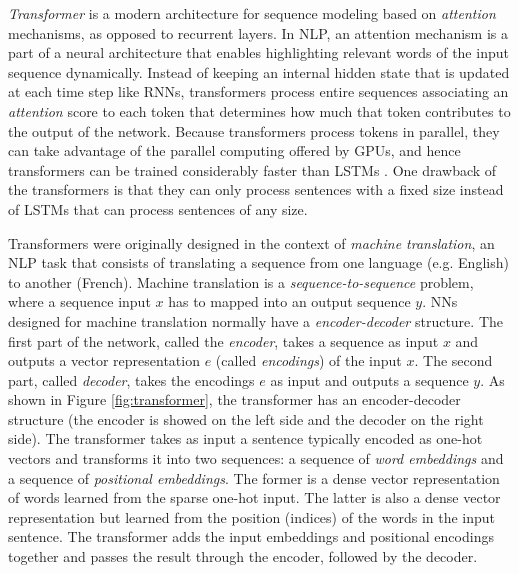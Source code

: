 \textit{Transformer} \cite{vaswani2017attention} is a modern architecture for sequence modeling based on \textit{attention} mechanisms, as opposed to recurrent layers. In NLP, an attention mechanism is a part of a neural architecture that enables highlighting relevant words of the input sequence dynamically. Instead of keeping an internal hidden state that is updated at each time step like RNNs, transformers process entire sequences associating an \textit{attention} score to each token that determines how much that token contributes to the output of the network. Because transformers process tokens in parallel, they can take advantage of the parallel computing offered by GPUs, and hence transformers can be trained considerably faster than LSTMs \cite{vaswani2017attention}. One drawback of the transformers is that they can only process sentences with a fixed size instead of LSTMs that can process sentences of any size.

Transformers were originally designed in the context of \textit{machine translation}, an NLP task that consists of translating a sequence from one language (e.g. English) to another (French). Machine translation is a \textit{sequence-to-sequence} problem, where a sequence input $x$ has to mapped into an output sequence $y$. NNs designed for machine translation normally have a \textit{encoder-decoder} structure. The first part of the network, called the \textit{encoder}, takes a sequence as input $x$ and outputs a vector representation $e$ (called \textit{encodings}) of the input $x$. The second part, called \textit{decoder}, takes the encodings $e$ as input and outputs a sequence $y$. As shown in Figure \ref{fig:transformer}, the transformer has an encoder-decoder structure (the encoder is showed on the left side and the decoder on the right side). The transformer takes as input a sentence typically encoded as one-hot vectors and transforms it into two sequences: a sequence of \textit{word embeddings} and a sequence of \textit{positional embeddings}. The former is a dense vector representation of words learned from the sparse one-hot input. The latter is also a dense vector representation but learned from the position (indices) of the words in the input sentence. The transformer adds the input embeddings and positional encodings together and passes the result through the encoder, followed by the decoder.


